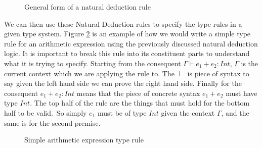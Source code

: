 \begin{figure}[H]
    \begin{prooftree}
    \end{prooftree}
    \caption{General form of a natural deduction rule}
    \label{fig:generalNatDectRule}
\end{figure}

We can then use these Natural Deduction rules to specify the type rules in a given type system\cite{ranta2012implementing,cardelli1996type,}.
Figure \ref{fig:simpleTypeRule} is an example of how we would write a simple type rule for an arithmetic expression using the previously discussed natural deduction logic.
It is important to break this rule into its constituent parts to understand what it is trying to specify.
Starting from the consequent $\Gamma \vdash e_1 + e_2 : Int$, $\Gamma$ is the current context which we are applying the rule to.
The $\vdash$ is piece of syntax to say given the left hand side we can prove the right hand side.
Finally for the consequent $e_1 + e_2 : Int$ means that the piece of concrete syntax $e_1 + e_2$ must have type $Int$.
The top half of the rule are the things that must hold for the bottom half to be valid.\
So simply $e_1$ must be of type $Int$ given the context $\Gamma$, and the same is for the second premise\cite{cardelli1996type,ranta2012implementing}.

\begin{figure}[H]
    \begin{prooftree}
    \end{prooftree}
    \caption{Simple arithmetic expression type rule}
    \label{fig:simpleTypeRule}
\end{figure}